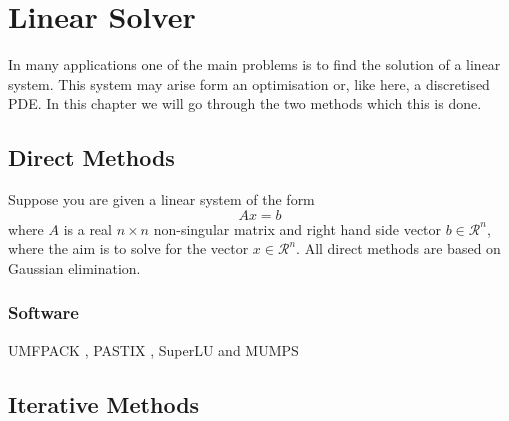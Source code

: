  \chapter{Linear Solver}

In many applications one of the main problems is to find the solution of a linear system. This system may arise form an optimisation or, like here, a discretised PDE. In this chapter we will go through the two methods which this is done.

\section{Direct Methods}

Suppose you are given a linear system of the form
$$Ax = b$$
where $A$ is a real $n\times n$ non-singular matrix and right hand side vector $b \in \mathcal{R}^n$, where the aim is to solve for the vector $x \in \mathcal{R}^n$. All direct methods are based on Gaussian elimination.

\subsection{Software}

UMFPACK \cite{Davis:2004:CPS:992200.992205,Davis:2004:AUV:992200.992206,Davis:1999:CUM:305658.287640,davis1997unsymmetric}, PASTIX \cite{henon2002pastix}, SuperLU \cite{superlu_ug99,li05} and MUMPS \cite{amestoy2000multifrontal,amestoy2001fully,amestoy2006hybrid}


\section{Iterative Methods}



